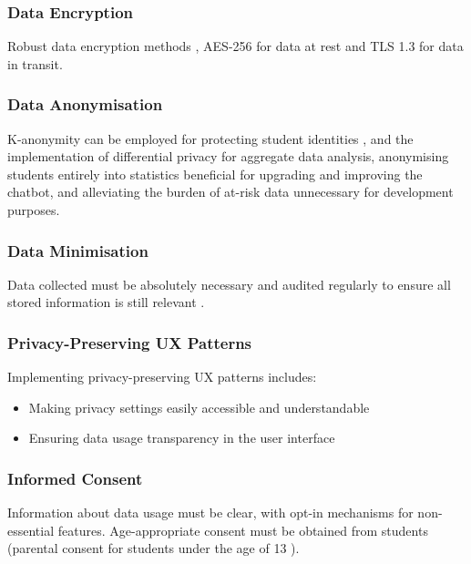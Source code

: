 \documentclass[14pt,a4paper]{article}
\begin{document}
\begin{multicols}{2}
\subsubsection*{Data Encryption}
Robust data encryption methods \textit{\parencite[pp. 100-150]{Stallings2023}}, AES-256 for data at rest and TLS 1.3 for data in transit.



\subsubsection{Data Anonymisation}
K-anonymity can be employed for protecting student identities \textit{\parencite[pp. 75-100]{ElEmamArbuckle2023}}, and the implementation of differential privacy for aggregate data analysis, anonymising students entirely into statistics beneficial for upgrading and improving the chatbot, and alleviating the burden of at-risk data unnecessary for development purposes.

\subsubsection{Data Minimisation}
Data collected must be absolutely necessary and audited regularly to ensure all stored information is still relevant \textit{\parencite{A29WP2018}}.

\subsubsection*{Privacy-Preserving UX Patterns}
Implementing privacy-preserving UX patterns \textit{\parencite[pp. 50-100]{Hartzog2023}} includes:
\begin{itemize}
    \item Making privacy settings easily accessible and understandable
    \item Ensuring data usage transparency in the user interface
\end{itemize}

\subsubsection*{Informed Consent}
Information about data usage must be clear, with opt-in mechanisms for non-essential features. Age-appropriate consent must be obtained from students (parental consent for students under the age of 13 \textit{\parencite{FTC2023}}).


\end{multicols}
\end{document}
